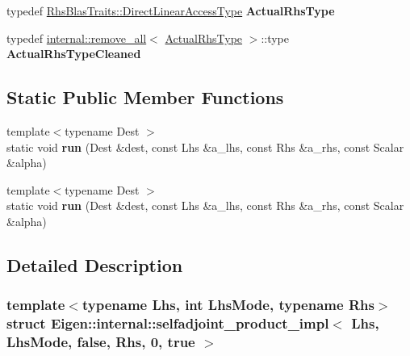 \begin{DoxyCompactItemize}
typedef \hyperlink{class_eigen_1_1internal_1_1_tensor_lazy_evaluator_writable}{Rhs\+Blas\+Traits\+::\+Direct\+Linear\+Access\+Type} {\bfseries Actual\+Rhs\+Type}
\item 
\mbox{\label{struct_eigen_1_1internal_1_1selfadjoint__product__impl_3_01_lhs_00_01_lhs_mode_00_01false_00_01_rhs_00_010_00_01true_01_4_adc2ed77f11c82a4d8111f3c041004589}} 
typedef \hyperlink{struct_eigen_1_1internal_1_1remove__all}{internal\+::remove\+\_\+all}$<$ \hyperlink{class_eigen_1_1internal_1_1_tensor_lazy_evaluator_writable}{Actual\+Rhs\+Type} $>$\+::type {\bfseries Actual\+Rhs\+Type\+Cleaned}
\end{DoxyCompactItemize}
\subsection*{Static Public Member Functions}
\begin{DoxyCompactItemize}
\item 
\mbox{\label{struct_eigen_1_1internal_1_1selfadjoint__product__impl_3_01_lhs_00_01_lhs_mode_00_01false_00_01_rhs_00_010_00_01true_01_4_a27c075c8c1e30a437d3e8ca0bafb2bf7}} 
{\footnotesize template$<$typename Dest $>$ }\\static void {\bfseries run} (Dest \&dest, const Lhs \&a\+\_\+lhs, const Rhs \&a\+\_\+rhs, const Scalar \&alpha)
\item 
\mbox{\label{struct_eigen_1_1internal_1_1selfadjoint__product__impl_3_01_lhs_00_01_lhs_mode_00_01false_00_01_rhs_00_010_00_01true_01_4_a27c075c8c1e30a437d3e8ca0bafb2bf7}} 
{\footnotesize template$<$typename Dest $>$ }\\static void {\bfseries run} (Dest \&dest, const Lhs \&a\+\_\+lhs, const Rhs \&a\+\_\+rhs, const Scalar \&alpha)
\end{DoxyCompactItemize}


\subsection{Detailed Description}
\subsubsection*{template$<$typename Lhs, int Lhs\+Mode, typename Rhs$>$\newline
struct Eigen\+::internal\+::selfadjoint\+\_\+product\+\_\+impl$<$ Lhs, Lhs\+Mode, false, Rhs, 0, true $>$}



